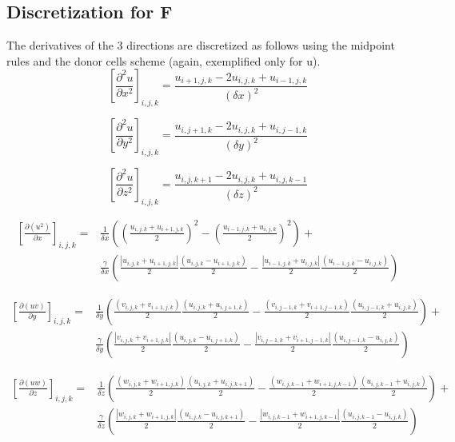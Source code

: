 \documentclass{article}%
\begin{document}
\subsection{Discretization for F}
The derivatives of the 3 directions are discretized as follows using the midpoint rules and the donor cells scheme (again, exemplified only for u).\\
\begin{equation}
\left[\frac{\partial^2 u}{\partial x^2}\right]_{i,j,k} =
\frac{u_{i+1,j,k} - 2u_{i,j,k} + u_{i-1,j,k}}{(\delta x)^2}
\end{equation}

\begin{equation}
\left[\frac{\partial^2 u}{\partial y^2}\right]_{i,j,k} =
\frac{u_{i,j+1,k} - 2u_{i,j,k} + u_{i,j-1,k}}{(\delta y)^2}
\end{equation}

\begin{equation}
\left[\frac{\partial^2 u}{\partial z^2}\right]_{i,j,k} =
\frac{u_{i,j,k+1} - 2u_{i,j,k} + u_{i,j,k-1}}{(\delta z)^2}
\end{equation}

\begin{equation}
\begin{split}
\left[\frac{\partial(u^2)}{\partial x}\right]_{i,j,k} = &
\frac{1}{\delta x}
\left(
	\left(\frac{u_{i,j,k}+u_{i+1,j,k}}{2}\right)^2 -
	\left(\frac{u_{i-1,j,k}+u_{i,j,k}}{2}\right)^2
\right) + \\
& \frac{\gamma}{\delta x}
\left(
	\frac{|u_{i,j,k}+u_{i+1,j,k}|}{2} \frac{(u_{i,j,k}-u_{i+1,j,k})}{2} -
	\frac{|u_{i-1,j,k}+u_{i,j,k}|}{2} \frac{(u_{i-1,j,k}-u_{i,j,k})}{2}
\right)
\end{split}
\end{equation}

\begin{equation}
\begin{split}
\left[\frac{\partial(uv)}{\partial y}\right]_{i,j,k} = &
\frac{1}{\delta y}
\left(
	\frac{(v_{i,j,k}+v_{i+1,j,k})}{2} \frac{(u_{i,j,k}+u_{i,j+1,k})}{2} -
	\frac{(v_{i,j-1,k}+v_{i+1,j-1,k})}{2} \frac{(u_{i,j-1,k}+u_{i,j,k})}{2}
\right) + \\
& \frac{\gamma}{\delta y}
\left(
	\frac{|v_{i,j,k}+v_{i+1,j,k}|}{2} \frac{(u_{i,j,k}-u_{i,j+1,k})}{2} -
	\frac{|v_{i,j-1,k}+v_{i+1,j-1,k}|}{2} \frac{(u_{i,j-1,k}-u_{i,j,k})}{2}
\right)
\end{split}
\end{equation}

\begin{equation}
\begin{split}
\left[\frac{\partial(uw)}{\partial z}\right]_{i,j,k} = &
\frac{1}{\delta z}
\left(
	\frac{(w_{i,j,k}+w_{i+1,j,k})}{2} \frac{(u_{i,j,k}+u_{i,j,k+1})}{2} -
	\frac{(w_{i,j,k-1}+w_{i+1,j,k-1})}{2} \frac{(u_{i,j,k-1}+u_{i,j,k})}{2}
\right) + \\
& \frac{\gamma}{\delta z}
\left(
	\frac{|w_{i,j,k}+w_{i+1,j,k}|}{2} \frac{(u_{i,j,k}-u_{i,j,k+1})}{2} -
	\frac{|w_{i,j,k-1}+w_{i+1,j,k-1}|}{2} \frac{(u_{i,j,k-1}-u_{i,j,k})}{2}
\right)
\end{split}
\end{equation}
\end{document}
